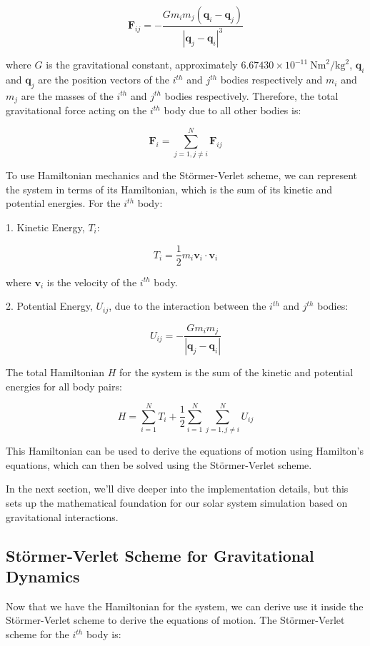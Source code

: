 \documentclass{report}
\begin{document}
\[
\mathbf{F}_{ij} = -\frac{G m_i m_j (\mathbf{q}_i - \mathbf{q}_j)}{|\mathbf{q}_j - \mathbf{q}_i|^3}
\]

where \(G\) is the gravitational constant, approximately \(6.67430 \times 10^{-11} \ \text{Nm}^2/\text{kg}^2\), \(\mathbf{q}_i\) and \(\mathbf{q}_j\) are the position vectors of the \(i^{th}\) and \(j^{th}\) bodies respectively and \(m_i\) and \(m_j\) are the masses of the \(i^{th}\) and \(j^{th}\) bodies respectively. Therefore, the total gravitational force acting on the \(i^{th}\) body due to all other bodies is:

\[
	\mathbf{F}_i = \sum_{j=1, j\neq i}^{N} \mathbf{F}_{ij}
\]

To use Hamiltonian mechanics and the Störmer-Verlet scheme, we can represent the system in terms of its Hamiltonian, which is the sum of its kinetic and potential energies. For the \(i^{th}\) body:

1. Kinetic Energy, \(T_i\):

\[
	T_i = \frac{1}{2} m_i \mathbf{v}_i \cdot \mathbf{v}_i
\]

where \(\mathbf{v}_i\) is the velocity of the \(i^{th}\) body.

2. Potential Energy, \(U_{ij}\), due to the interaction between the \(i^{th}\) and \(j^{th}\) bodies:

\[
	U_{ij} = -\frac{G m_i m_j}{|\mathbf{q}_j - \mathbf{q}_i|}
\]

The total Hamiltonian \(H\) for the system is the sum of the kinetic and potential energies for all body pairs:

\[
	H = \sum_{i=1}^{N} T_i + \frac{1}{2} \sum_{i=1}^{N} \sum_{j=1, j\neq i}^{N} U_{ij}
\]

This Hamiltonian can be used to derive the equations of motion using Hamilton's equations, which can then be solved using the Störmer-Verlet scheme.

In the next section, we'll dive deeper into the implementation details, but this sets up the mathematical foundation for our solar system simulation based on gravitational interactions.

\subsection{Störmer-Verlet Scheme for Gravitational Dynamics}
\label{sec:stormer_verlet_scheme_gravitational_dynamics}

Now that we have the Hamiltonian for the system, we can derive use it inside the Störmer-Verlet scheme to derive the equations of motion. The Störmer-Verlet scheme for the \(i^{th}\) body is:
\end{document}
